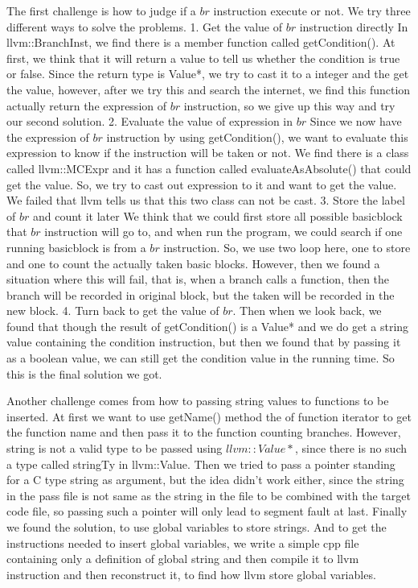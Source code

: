 \documentclass{article}
\begin{document}
The first challenge is how to judge if a $br$ instruction execute or not.
We try three different ways to solve the problems.
	1. Get the value of $br$ instruction directly
		In llvm::BranchInst, we find there is a member function called getCondition(). At first, we think that it will return a value to tell us whether the condition is true or false. Since the return type is Value*, we try to cast it to a integer and the get the value, however, after we try this and search the internet, we find this function actually return the expression of $br$ instruction, so we give up this way and try our second solution.
	2. Evaluate the value of expression in $br$
		Since we now have the expression of $br$  instruction by using getCondition(), we want to evaluate this expression to know if the instruction will be taken or not. We find there is a class called llvm::MCExpr and it has a function called evaluateAsAbsolute() that could get the value. So, we try to cast out expression to it and want to get the value. We failed that llvm tells us that this two class can not be cast.
	3. Store the label of $br$ and count it later
		We think that we could first store all possible basicblock that $br$ instruction will go to, and when run the program, we could search if one running basicblock is from a $br$ instruction. So, we use two loop here, one to store and one to count the actually taken basic blocks. However, then we found a situation where this will fail, that is, when a branch calls a function, then the branch will be recorded in original block, but the taken will be recorded in the new block.
    4. Turn back to get the value of $br$.
        Then when we look back, we found that though the result of getCondition() is a Value* and we do get a string value containing the condition instruction, but then we found that by passing it as a boolean value, we can still get the condition value in the running time. So this is the final solution we got.

Another challenge comes from how to passing string values to functions to be inserted. At first we want to use getName() method the of function iterator to get the function name and then pass it to the function counting branches. However, string is not a valid type to be passed using $llvm::Value*$, since there is no such a type called stringTy in llvm::Value. Then we tried to pass a pointer standing for a C type string as argument, but the idea didn't work either, since the string in the pass file is not same as the string in the file to be combined with the target code file, so passing such a pointer will only lead to segment fault at last. Finally we found the solution, to use global variables to store strings. And to get the instructions needed to insert global variables, we write a simple cpp file containing only a definition of global string and then compile it to llvm instruction and then reconstruct it, to find how llvm store global variables.
\end{document}
